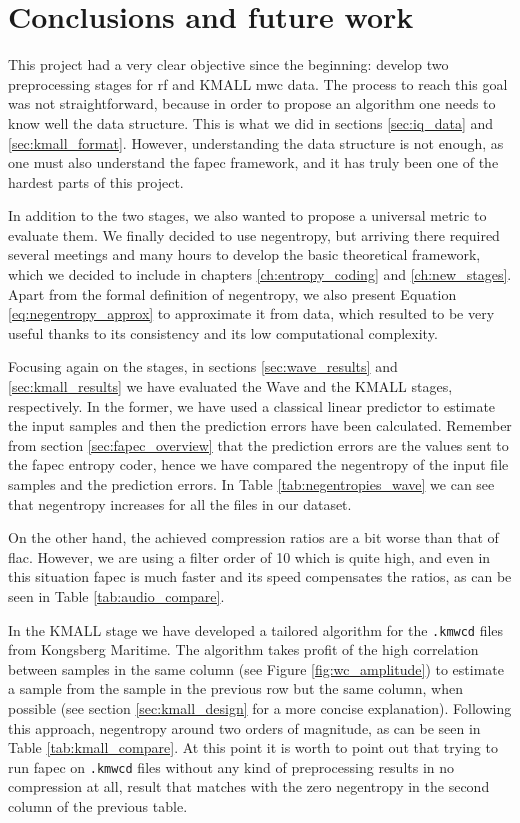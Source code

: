 \chapter{Conclusions and future work}
This project had a very clear objective since the beginning: develop two preprocessing stages for \acrfull{rf} and KMALL \acrshort{mwc} data. The process to reach this goal was not straightforward, because in order to propose an algorithm one needs to know well the data structure. This is what we did in sections \ref{sec:iq_data} and \ref{sec:kmall_format}. However, understanding the data structure is not enough, as one must also understand the \acrshort{fapec} framework, and it has truly been one of the hardest parts of this project.

In addition to the two stages, we also wanted to propose a universal metric to evaluate them. We finally decided to use negentropy, but arriving there required several meetings and many hours to develop the basic theoretical framework, which we decided to include in chapters \ref{ch:entropy_coding} and \ref{ch:new_stages}. Apart from the formal definition of negentropy, we also present Equation \ref{eq:negentropy_approx} to approximate it from data, which resulted to be very useful thanks to its consistency and its low computational complexity.

Focusing again on the stages, in sections \ref{sec:wave_results} and \ref{sec:kmall_results} we have evaluated the Wave and the KMALL stages, respectively. In the former, we have used a classical linear predictor to estimate the input samples and then the prediction errors have been calculated. Remember from section \ref{sec:fapec_overview} that the prediction errors are the values sent to the \acrshort{fapec} entropy coder, hence we have compared the negentropy of the input file samples and the prediction errors. In Table \ref{tab:negentropies_wave} we can see that negentropy increases for all the files in our dataset.

On the other hand, the achieved compression ratios are a bit worse than that of \acrshort{flac}. However, we are using a filter order of 10 which is quite high, and even in this situation \acrshort{fapec} is much faster and its speed compensates the ratios, as can be seen in Table \ref{tab:audio_compare}.

In the KMALL stage we have developed a tailored algorithm for the \texttt{.kmwcd} files from Kongsberg Maritime. The algorithm takes profit of the high correlation between samples in the same column (see Figure \ref{fig:wc_amplitude}) to estimate a sample from the sample in the previous row but the same column, when possible (see section \ref{sec:kmall_design} for a more concise explanation). Following this approach, negentropy around two orders of magnitude, as can be seen in Table \ref{tab:kmall_compare}. At this point it is worth to point out that trying to run \acrshort{fapec} on \texttt{.kmwcd} files without any kind of preprocessing results in no compression at all, result that matches with the zero negentropy in the second column of the previous table.

